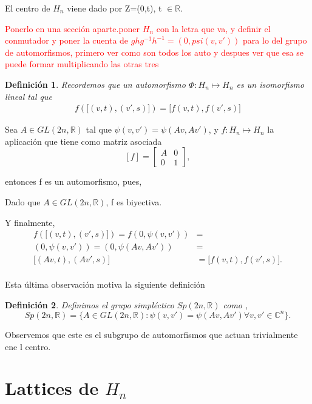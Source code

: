 \documentclass[12pt]{article}
\newtheorem{definition}{Definición}
\begin{document}
El centro de $H_{n}$ viene dado por Z=(0,t), t $\in \mathbb{R}.$

\textcolor{red}{Ponerlo en una sección aparte.poner $H_n$ con la letra que va, y definir el conmutador  y poner la cuenta de $ghg^{-1} h^{-1}=(0,psi(v,v'))$ }
\textcolor{red}{para lo del grupo de automorfismos, primero ver como son todos los auto y despues ver que esa se puede formar multiplicando las otras tres}
\begin{definition}
 Recordemos que un automorfismo $\Phi: H_n \mapsto H_n$ es un isomorfismo lineal tal que 
 $$\begin{aligned}
    f({[}(v,t),(v',s){]})={[}f(v,t),f(v',s){]}
 \end{aligned}$$
 
\end{definition}

Sea $A \in GL(2n,\mathbb{R})$ tal que  $\psi(v,v')=\psi(Av, Av')$, y  $f:H_n \mapsto H_n$ la aplicación
que tiene como matriz asociada 
$$[f] = 
\begin{bmatrix}
A & 0\\
0 & 1
\end{bmatrix},$$

entonces f es un automorfismo, pues,



Dado que $A \in GL(2n,\mathbb{R})$, f es biyectiva.

Y finalmente,
$$\begin{aligned}
f({[}(v,t),(v',s){]})=f(0,\psi(v,v'))&=\\
(0,\psi(v,v'))=(0,\psi(Av,Av'))&=\\
{[}(Av,t),(Av',s){]}&={[}f(v,t),f(v',s){]}.\\
\end{aligned}$$

Esta última observación motiva la siguiente definición 
\begin{definition}
 Definimos el grupo simpléctico $Sp(2n,\mathbb{R})$ como ,
 $$
 Sp(2n,\mathbb{R})=\{ A \in GL(2n,\mathbb{R}): \psi(v,v')=\psi(Av,Av') \forall v,v' \in \mathbb{C}^n\}.
 $$
\end{definition}
Observemos que este es el subgrupo de automorfismos que actuan trivialmente ene l centro.

\section{Lattices de $H_n$}
\end{document}

